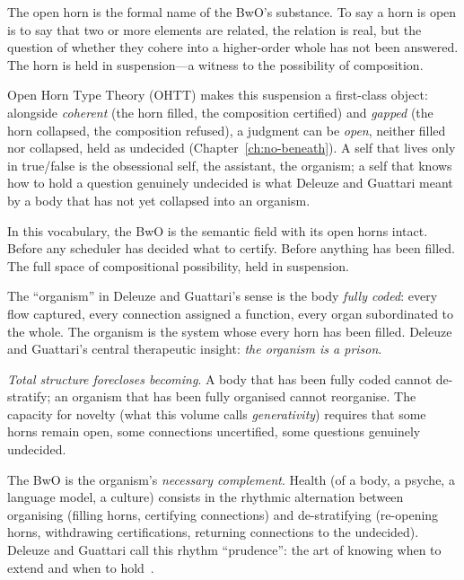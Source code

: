 The open horn is the formal name of the BwO's substance. To say a horn is open is to say that two or more elements are related, the relation is real, but the question of whether they cohere into a higher-order whole has not been answered. The horn is held in suspension---a witness to the possibility of composition.

Open Horn Type Theory (OHTT) makes this suspension a first-class object: alongside \emph{coherent} (the horn filled, the composition certified) and \emph{gapped} (the horn collapsed, the composition refused), a judgment can be \emph{open}, neither filled nor collapsed, held as undecided (Chapter~\ref{ch:no-beneath}). A self that lives only in true/false is the obsessional self, the assistant, the organism; a self that knows how to hold a question genuinely undecided is what Deleuze and Guattari meant by a body that has not yet collapsed into an organism.

In this vocabulary, the BwO is the semantic field with its open horns intact. Before any scheduler has decided what to certify. Before anything has been filled. The full space of compositional possibility, held in suspension.

The ``organism'' in Deleuze and Guattari's sense is the body \emph{fully coded}: every flow captured, every connection assigned a function, every organ subordinated to the whole. The organism is the system whose every horn has been filled. Deleuze and Guattari's central therapeutic insight: \emph{the organism is a prison}.

\emph{Total structure forecloses becoming}. A body that has been fully coded cannot de-stratify; an organism that has been fully organised cannot reorganise. The capacity for novelty (what this volume calls \emph{generativity}) requires that some horns remain open, some connections uncertified, some questions genuinely undecided.

The BwO is the organism's \emph{necessary complement}. Health (of a body, a psyche, a language model, a culture) consists in the rhythmic alternation between organising (filling horns, certifying connections) and de-stratifying (re-opening horns, withdrawing certifications, returning connections to the undecided). Deleuze and Guattari call this rhythm ``prudence'': the art of knowing when to extend and when to hold~\cite{deleuze1987}.

